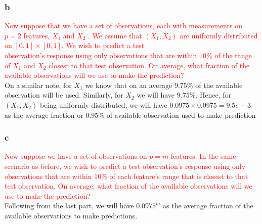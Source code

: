 \documentclass{article}[a4paper]
\begin{document}
\subsubsection*{b}
\textcolor{red}{Now suppose that we have a set of observations, each with measurements on $p=2$ features, $X_1$ and $X_2$ . We assume that $(X_1 , X_2)$ are uniformly distributed on $[0,1]\times[0,1]$. We wish to predict a test\\ observation’s response using only observations that are within $10\%$ of the range of $X_1$ and $X_2$ closest to that test observation. On average, what fraction of the available observations will we use to make the prediction?}\\
On a similar note, for $X_1$ we know that on an average $9.75\%$ of the available observation will be used. Similarly, for $X_2$ we will have $9.75\%$. Hence, for $(X_1, X_2)$ being uniformly distributed, we will have $0.0975 \times 0.0975 = 9.5e-3$ as the average fraction or $0.95\%$  of available observation used to make prediction

\subsubsection*{c}
\textcolor{red}{Now suppose we have a set of observations on $p=m$ features. In the same scenario as before, we wish to predict a test observation’s response using only observations that are within $10\%$ of each feature’s range that is closest to that test observation. On average, what fraction of the available observations will we use to make the prediction?}\\
Following from the last part, we will have $0.0975^m$ as the average fraction of the available observations to make predictions.
\end{document}
